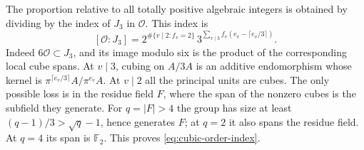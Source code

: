 \documentclass[11pt,letterpaper]{article}
\theoremstyle{definition}
\numberwithin{equation}{section}
\begin{document}
The proportion relative to all totally positive algebraic integers
is obtained by dividing by the index of $J_3$ in $\mathcal O$.
This index is
\begin{equation}\label{eq:cubic-order-index}
 [\mathcal O:J_3]=2^{\#\{v\mid2:f_v=2\}}\,
       3^{\sum_{v\mid3} f_v(e_v-\lceil e_v/3\rceil)} .
\end{equation}
Indeed $6\mathcal O\subset J_3$, and its image modulo six is the
product of the corresponding local cube spans. At $v\mid3$, cubing
on $A/3A$ is an additive endomorphism whose kernel is
$\pi^{\lceil e_v/3\rceil} A/\pi^{e_v}A$. At $v\mid2$ all the
principal units are cubes. The only possible loss is in the residue
field $F$, where the span of the nonzero cubes is the subfield they
generate. For $q=|F|>4$ the group has size at least
$(q-1)/3>\sqrt q-1$, hence generates $F$; at $q=2$ it also spans
the residue field. At $q=4$ its span is $\mathbb F_2$.
This proves \eqref{eq:cubic-order-index}.
\end{document}
